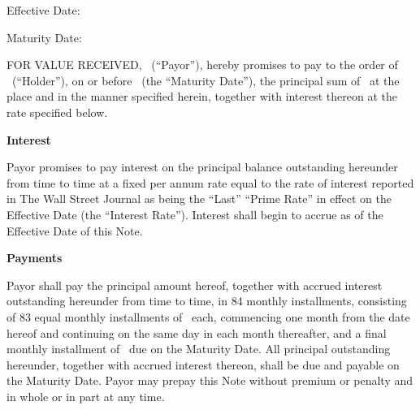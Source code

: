 
\bigskip

\begin{center}
\principalAmount

\smallskip
Effective Date: \effectiveDate

\smallskip
Maturity Date: \maturityDate
\end{center}

\bigskip

\noindent FOR VALUE RECEIVED, \payorName\ (``Payor''), hereby promises to pay to the order
of \holderName\ (``Holder''), on or before \maturityDate\ (the ``Maturity Date''), the
principal sum of \principalAmount\ at the place and in the manner specified herein, together
with interest thereon at the rate specified below.

\par\medskip\noindent\textbf{Interest}\par
Payor promises to pay interest on the principal balance outstanding hereunder from time to
time at a fixed per annum rate equal to the rate of interest reported in The Wall Street
Journal as being the ``Last'' ``Prime Rate'' in effect on the Effective Date (the ``Interest
Rate''). Interest shall begin to accrue as of the Effective Date of this Note.

\par\medskip\noindent\textbf{Payments}\par
Payor shall pay the principal amount hereof, together with accrued interest outstanding
hereunder from time to time, in 84 monthly installments, consisting of 83 equal monthly
installments of \installmentAmount\ each, commencing one month from the date hereof and
continuing on the same day in each month thereafter, and a final monthly installment of
\finalInstallment\ due on the Maturity Date. All principal outstanding hereunder, together
with accrued interest thereon, shall be due and payable on the Maturity Date. Payor may
prepay this Note without premium or penalty and in whole or in part at any time.

